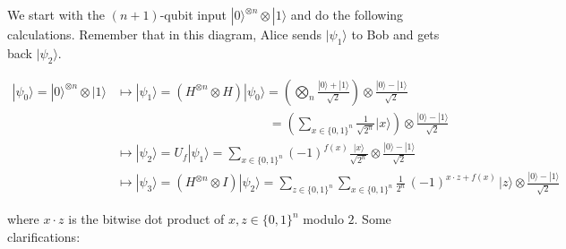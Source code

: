 \documentclass{article}
\theoremstyle{definition}
\begin{document}
    We start with the $(n+1)$-qubit input $|0\rangle^{\otimes n} \otimes |1\rangle$ and do the following calculations. Remember that in this diagram, Alice sends $|\psi_1\rangle$ to Bob and gets back $|\psi_2\rangle$. 

    \begin{align*} 
      |\psi_0 \rangle = |0\rangle^{\otimes n} \otimes |1\rangle & \longmapsto |\psi_1 \rangle = (H^{\otimes n} \otimes H) |\psi_0 \rangle = \left( \bigotimes_{n} \frac{|0\rangle + |1\rangle}{\sqrt{2}} \right) \otimes \frac{|0\rangle - |1\rangle}{\sqrt{2}} \\ 
      & \;\;\;\;\;\;\;\;\;\;\;\;\;\;\;\;\;\;\;\;\;\;\;\;\;\;\;\;\;\;\;\;\;\;\;\;\;\;\;\;\;\;\;\, = \left( \sum_{x \in \{0, 1\}^n} \frac{1}{\sqrt{2^n}} |x\rangle \right) \otimes \frac{|0\rangle - |1\rangle}{\sqrt{2}} \\
      & \longmapsto |\psi_2 \rangle = U_f |\psi_1\rangle = \sum_{x \in \{0,1\}^n} (-1)^{f(x)} \frac{|x\rangle}{\sqrt{2^n}} \otimes \frac{|0\rangle - |1\rangle}{\sqrt{2}} \\
      & \longmapsto |\psi_3 \rangle = (H^{\otimes n} \otimes I) |\psi_2 \rangle = \sum_{z \in \{0, 1\}^n} \sum_{x \in \{0, 1\}^n} \frac{1}{2^n}\, (-1)^{x \cdot z + f(x)} \,|z\rangle \otimes \frac{|0\rangle - |1\rangle}{\sqrt{2}} 
    \end{align*}

    where $x \cdot z$ is the bitwise dot product of $x, z \in \{0, 1\}^n$ modulo $2$. Some clarifications:
\end{document}
